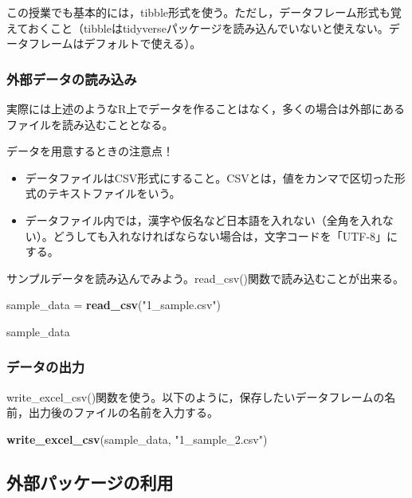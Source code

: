 \documentclass[]{article}
\newenvironment{Shaded}{\begin{snugshade}}{\end{snugshade}}
\newcommand{\KeywordTok}[1]{\textcolor[rgb]{0.13,0.29,0.53}{\textbf{#1}}}
\newcommand{\StringTok}[1]{\textcolor[rgb]{0.31,0.60,0.02}{#1}}
\newcommand{\NormalTok}[1]{#1}
\providecommand{\tightlist}{%
  \setlength{\itemsep}{0pt}\setlength{\parskip}{0pt}}
\begin{document}
この授業でも基本的には，tibble形式を使う。ただし，データフレーム形式も覚えておくこと（tibbleはtidyverseパッケージを読み込んでいないと使えない。データフレームはデフォルトで使える）。

\subsubsection{外部データの読み込み}

実際には上述のようなR上でデータを作ることはなく，多くの場合は外部にあるファイルを読み込むこととなる。

データを用意するときの注意点！

\begin{itemize}
\tightlist
\item
  データファイルはCSV形式にすること。CSVとは，値をカンマで区切った形式のテキストファイルをいう。
\item
  データファイル内では，漢字や仮名など日本語を入れない（全角を入れない）。どうしても入れなければならない場合は，文字コードを「UTF-8」にする。
\end{itemize}

サンプルデータを読み込んでみよう。read\_csv()関数で読み込むことが出来る。

\begin{Shaded}
\begin{Highlighting}[]
\NormalTok{sample_data =}\StringTok{ }\KeywordTok{read_csv}\NormalTok{(}\StringTok{"1_sample.csv"}\NormalTok{)}

\NormalTok{sample_data}
\end{Highlighting}
\end{Shaded}

\subsubsection{データの出力}

write\_excel\_csv()関数を使う。以下のように，保存したいデータフレームの名前，出力後のファイルの名前を入力する。

\begin{Shaded}
\begin{Highlighting}[]
\KeywordTok{write_excel_csv}\NormalTok{(sample_data, }\StringTok{"1_sample_2.csv"}\NormalTok{)}
\end{Highlighting}
\end{Shaded}

\subsection{外部パッケージの利用}
\end{document}
